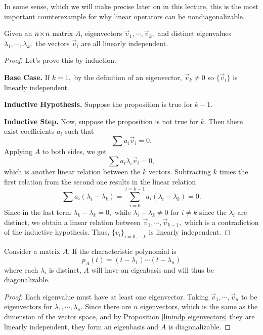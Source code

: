 In some sense, which we will make precise later on in this lecture, this is the most important counterexample for why linear operators can be nondiagonalizable.

\begin{proposition}\label{linindp eigenvectors}
Given an $n \hspace{0.05em}{\times}\hspace{0.05em} n$ matrix $A$, eigenvectors $\vec{v}_1, \cdots, \vec{v}_k,$ and distinct eigenvalues $\lambda_1, \cdots, \lambda_k,$ the vectors $\vec{v}_i$ are all linearly independent.
\end{proposition}
\begin{proof}
Let's prove this by induction. 



\textbf{Base Case.} If $k = 1,$ by the definition of an eigenvector, $\vec{v}_k \neq 0$ so $\{\vec{v}_i\}$ is linearly independent. 

\textbf{Inductive Hypothesis.} Suppose the proposition is true for $k - 1.$ 

\textbf{Inductive Step.} Now, suppose the proposition is not true for $k$. Then there exist coefficients $a_i$ such that \[\sum a_i \vec{v}_i = 0.\] Applying $A$ to both sides, we get 
\[
\sum a_i\lambda_i \vec{v}_i = 0,
\]
which is another linear relation between the $k$ vectors. Subtracting $k$ times the first relation from the second one results in the linear relation 
\[
\sum a_i(\lambda_i - \lambda_k) = \sum_{i = 0}^{i = k-1} a_i(\lambda_i - \lambda_k) = 0.
\]
Since in the last term $\lambda_k - \lambda_k = 0,$ while $\lambda_i - \lambda_k \neq 0$ for $i \neq k$ since the $\lambda_i$ are distinct, we obtain a linear relation between $\vec{v}_1, \cdots, \vec{v}_{k - 1},$ which is a contradiction of the inductive hypothesis. Thus, $\{v_i\}_{i = 0, \cdots, k}$ is linearly independent. 
\end{proof}

\begin{corollary}
Consider a matrix $A$. If the characteristic polynomial is 
\[
p_A(t) = (t - \lambda_1) \cdots (t - \lambda_n)
\]
where each $\lambda_i$ is distinct, $A$ will have an eigenbasis and will thus be diagonalizable. 
\end{corollary}
\begin{proof}
Each eigenvalue must have at least one eigenvector. Taking $\vec{v}_1, \cdots, \vec{v}_n$ to be eigenvectors for $\lambda_1, \cdots, \lambda_n$. Since there are $n$ eigenvectors, which is the same as the dimension of the vector space, and by Proposition \ref{linindp eigenvectors} they are linearly independent, they form an eigenbasis and $A$ is diagonalizable. 
\end{proof}

